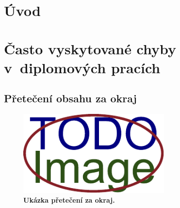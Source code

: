 
%





\chapter{Úvod}

\dummyText

\dummyText[2]

\dummyShortText[15]





\chapter{Často vyskytované chyby v~diplomových pracích}

\dummyShortText[6]

\dummyText


\section{Přetečení obsahu za okraj}
\dummyShortText[10]
\begin{figure}[H]
    \centering
    \includegraphics[width=\linewidth,height=1.7in]{obrazky-figures/placeholder.pdf}
    \caption{\textbf{Ukázka přetečení za okraj.} }
\end{figure}


